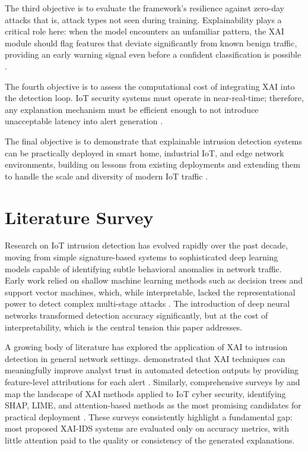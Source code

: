 \documentclass[a4paper,fleqn]{cas-dc}
\numberwithin{equation}{section}
\begin{document}
The third objective is to evaluate the framework's resilience against zero-day attacks that is, attack types not seen during training. Explainability plays a critical role here: when the model encounters an unfamiliar pattern, the XAI module should flag features that deviate significantly from known benign traffic, providing an early warning signal even before a confident classification is possible \cite{aspg2025zeroday, ijcrt2025threat}.

The fourth objective is to assess the computational cost of integrating XAI into the detection loop. IoT security systems must operate in near-real-time; therefore, any explanation mechanism must be efficient enough to not introduce unacceptable latency into alert generation \cite{saheed2022explainable, chen2022explainable}.

The final objective is to demonstrate that explainable intrusion detection systems can be practically deployed in smart home, industrial IoT, and edge network environments, building on lessons from existing deployments and extending them to handle the scale and diversity of modern IoT traffic \cite{zolanvari2021transparent, anthony2025designing}.

\section{Literature Survey}
\label{sec:literature}

Research on IoT intrusion detection has evolved rapidly over the past decade, moving from simple signature-based systems to sophisticated deep learning models capable of identifying subtle behavioral anomalies in network traffic. Early work relied on shallow machine learning methods such as decision trees and support vector machines, which, while interpretable, lacked the representational power to detect complex multi-stage attacks \cite{jes2024iot}. The introduction of deep neural networks transformed detection accuracy significantly, but at the cost of interpretability, which is the central tension this paper addresses.

A growing body of literature has explored the application of XAI to intrusion detection in general network settings. \citeauthor{siganos2023explainable} demonstrated that XAI techniques can meaningfully improve analyst trust in automated detection outputs by providing feature-level attributions for each alert \cite{siganos2023explainable}. Similarly, comprehensive surveys by \citeauthor{nguyen2022explainable} and \citeauthor{das2023trustworthy} map the landscape of XAI methods applied to IoT cyber security, identifying SHAP, LIME, and attention-based methods as the most promising candidates for practical deployment \cite{nguyen2022explainable, das2023trustworthy}. These surveys consistently highlight a fundamental gap: most proposed XAI-IDS systems are evaluated only on accuracy metrics, with little attention paid to the quality or consistency of the generated explanations.
\end{document}
